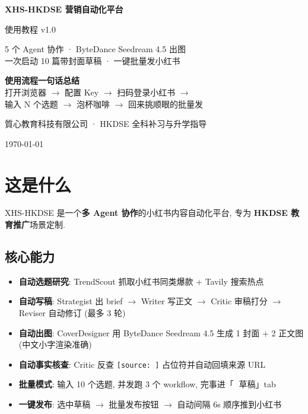 \documentclass[11pt,a4paper]{article}
\begin{document}
\begin{titlepage}
\centering
\vspace*{2cm}
{\Huge\bfseries\color{xhsRed} XHS-HKDSE 营销自动化平台\par}
\vspace{0.5cm}
{\Large 使用教程 v1.0\par}
\vspace{1.2cm}
{\large 5 个 Agent 协作 · ByteDance Seedream 4.5 出图\\ 一次启动 10 篇带封面草稿 · 一键批量发小红书\par}
\vspace{2cm}

\begin{tcolorbox}[width=12cm, colback=xhsBg, colframe=xhsRed, arc=4mm]
\centering\large
\textbf{使用流程一句话总结}\\[6pt]
打开浏览器 \(\to\) 配置 Key \(\to\) 扫码登录小红书 \(\to\) \\
输入 N 个选题 \(\to\) 泡杯咖啡 \(\to\) 回来挑顺眼的批量发
\end{tcolorbox}

\vfill
{\large 質心教育科技有限公司 · HKDSE 全科补习与升学指导\par}
\vspace{0.4cm}
{\small\today}
\end{titlepage}

\tableofcontents
\newpage

\section{这是什么}

XHS-HKDSE 是一个\textbf{多 Agent 协作}的小红书内容自动化平台, 专为 \textbf{HKDSE 教育推广}场景定制.

\subsection{核心能力}
\begin{itemize}[leftmargin=*]
  \item \textbf{自动选题研究}: TrendScout 抓取小红书同类爆款 + Tavily 搜索热点
  \item \textbf{自动写稿}: Strategist 出 brief \(\to\) Writer 写正文 \(\to\) Critic 审稿打分 \(\to\) Reviser 自动修订 (最多 3 轮)
  \item \textbf{自动出图}: CoverDesigner 用 ByteDance Seedream 4.5 生成 1 封面 + 2 正文图 (中文小字渲染准确)
  \item \textbf{自动事实核查}: Critic 反查 \texttt{[source: ]} 占位符并自动回填来源 URL
  \item \textbf{批量模式}: 输入 10 个选题, 并发跑 3 个 workflow, 完事进「📝 草稿」tab
  \item \textbf{一键发布}: 选中草稿 \(\to\) 批量发布按钮 \(\to\) 自动间隔 6s 顺序推到小红书
\end{itemize}
\end{document}
